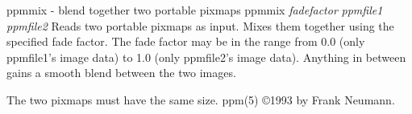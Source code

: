 \newpage
%

ppmmix - blend together two portable pixmaps
ppmmix 
{\it fadefactor}
{\it ppmfile1 ppmfile2}
Reads two portable pixmaps as input. Mixes them together using the
specified fade factor. The fade factor may be in the range from 0.0
(only ppmfile1's image data) to 1.0 (only ppmfile2's image data).
Anything in between gains a smooth blend between the two images.
\par
The two pixmaps must have the same size.
ppm(5)
\copyright 1993 by Frank Neumann.
%

%

\newpage
%

